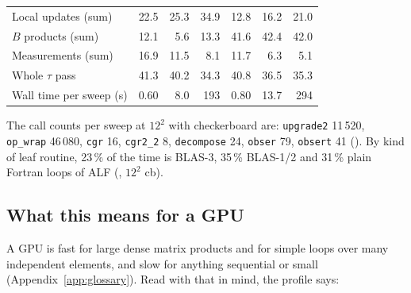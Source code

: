 \begin{table}[h]
\begin{tabular}{@{}lrrrrrr@{}}
Local updates (sum) & 22.5 & 25.3 & 34.9 & 12.8 & 16.2 & 21.0 \\ %
$B$ products (sum) & 12.1 & 5.6 & 13.3 & 41.6 & 42.4 & 42.0 \\ %
Measurements (sum) & 16.9 & 11.5 & 8.1 & 11.7 & 6.3 & 5.1 \\ %
Whole $\tau$ pass & 41.3 & 40.2 & 34.3 & 40.8 & 36.5 & 35.3 \\ %
\midrule
Wall time per sweep (s) & 0.60 & 8.0 & 193 & 0.80 & 13.7 & 294 \\ %
\bottomrule
\end{tabular}
\end{table}

The call counts per sweep at $12^2$ with checkerboard are: \texttt{upgrade2} 11\,520, \texttt{op\_wrap} 46\,080, \texttt{cgr} 16, \texttt{cgr2\_2} 8, \texttt{decompose} 24, \texttt{obser} 79, \texttt{obsert} 41 (). %
By kind of leaf routine, 23\,\% of the time is BLAS-3, 35\,\% BLAS-1/2 and 31\,\% plain Fortran loops of ALF (, $12^2$ cb). %



\subsection{What this means for a GPU}

A GPU is fast for large dense matrix products and for simple loops over many independent elements, and slow for anything sequential or small (Appendix~\ref{app:glossary}). Read with that in mind, the profile says:

